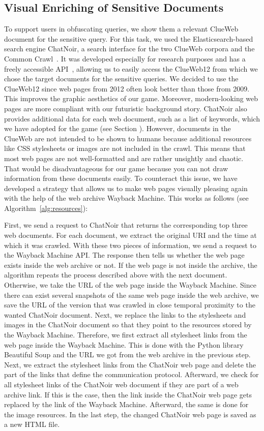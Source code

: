 \subsection{Visual Enriching of Sensitive Documents}
\label{enriching}
To support users in obfuscating queries, we show them a relevant ClueWeb document for the sensitive query. For this task, we used the Elasticsearch-based search engine ChatNoir, a search interface for the two ClueWeb corpora and the Common Crawl~\cite{chatnoir}. It was developed especially for research purposes and has a freely accessible API~\cite{chatnoir}, allowing us to easily access the ClueWeb12 from which we chose the target documents for the sensitive queries. We decided to use the ClueWeb12 since web pages from 2012 often look better than those from 2009. This improves the graphic aesthetics of our game. Moreover, modern-looking web pages are more compliant with our futuristic background story. ChatNoir also provides additional data for each web document, such as a list of keywords, which we have adopted for the game (see Section ). However, documents in the ClueWeb are not intended to be shown to humans because additional resources like CSS stylesheets or images are not included in the crawl. This means that most web pages are not well-formatted and are rather unsightly and chaotic. That would be disadvantageous for our game because you can not draw information from these documents easily. To counteract this issue, we have developed a strategy that allows us to make web pages visually pleasing again with the help of the web archive Wayback Machine. This works as follows (see Algorithm~\ref{alg:resources}):\par
First, we send a request to ChatNoir that returns the corresponding top three web documents. For each document, we extract the original URI and the time at which it was crawled. With these two pieces of information, we send a request to the Wayback Machine API. The response then tells us whether the web page exists inside the web archive or not. If the web page is not inside the archive, the algorithm repeats the process described above with the next document. Otherwise, we take the URL of the web page inside the Wayback Machine. Since there can exist several snapshots of the same web page inside the web archive, we save the URL of the version that was crawled in close temporal proximity to the wanted ChatNoir document. Next, we replace the links to the stylesheets and images in the ChatNoir document so that they point to the resources stored by the Wayback Machine. Therefore, we first extract all stylesheet links from the web page inside the Wayback Machine. This is done with the Python library Beautiful Soup and the URL we got from the web archive in the previous step. Next, we extract the stylesheet links from the ChatNoir web page and delete the part of the links that define the communication protocol. Afterward, we check for all stylesheet links of the ChatNoir web document if they are part of a web archive link. If this is the case, then the link inside the ChatNoir web page gets replaced by the link of the Wayback Machine. Afterward, the same is done for the image resources. In the last step, the changed ChatNoir web page is saved as a new HTML file.\\
